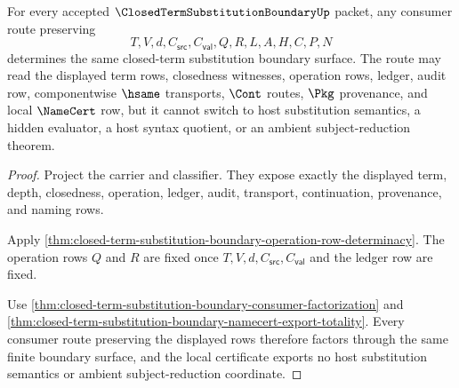 \begin{theorem}
\label{thm:closed-term-substitution-boundary-consumer-route-determinacy}
For every accepted $\ClosedTermSubstitutionBoundaryUp$ packet, any consumer route preserving
$$
T,V,d,C_{\mathsf{src}},C_{\mathsf{val}},Q,R,L,A,H,C,P,N
$$
determines the same closed-term substitution boundary surface. The route may read the displayed term rows, closedness witnesses, operation rows, ledger, audit row, componentwise $\hsame$ transports, $\Cont$ routes, $\Pkg$ provenance, and local $\NameCert$ row, but it cannot switch to host substitution semantics, a hidden evaluator, a host syntax quotient, or an ambient subject-reduction theorem.
\end{theorem}
\begin{proof}
Project the carrier and classifier. They expose exactly the displayed term, depth, closedness, operation, ledger, audit, transport, continuation, provenance, and naming rows.

Apply \autoref{thm:closed-term-substitution-boundary-operation-row-determinacy}. The operation rows $Q$ and $R$ are fixed once $T,V,d,C_{\mathsf{src}},C_{\mathsf{val}}$ and the ledger row are fixed.

Use \autoref{thm:closed-term-substitution-boundary-consumer-factorization} and \autoref{thm:closed-term-substitution-boundary-namecert-export-totality}. Every consumer route preserving the displayed rows therefore factors through the same finite boundary surface, and the local certificate exports no host substitution semantics or ambient subject-reduction coordinate.
\end{proof}

